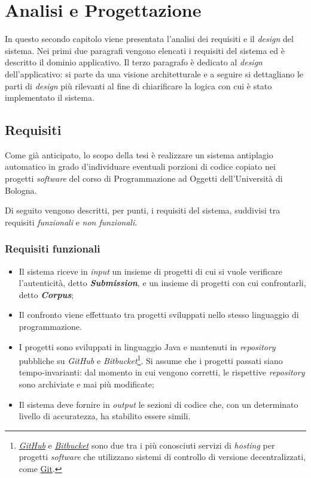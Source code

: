 \chapter{Analisi e Progettazione}
\label{chapter:analysis}
In questo secondo capitolo viene presentata l'analisi dei requisiti e il \textit{design} del sistema.
%
Nei primi due paragrafi vengono elencati i requisiti del sistema ed è descritto il dominio applicativo.
%
Il terzo paragrafo è dedicato al \textit{design} dell'applicativo: si parte da una visione architetturale e a seguire si dettagliano le parti di \textit{design} più rilevanti al fine di chiarificare la logica con cui è stato implementato il sistema.

\section{Requisiti}
Come già anticipato, lo scopo della tesi è realizzare un sistema antiplagio automatico in grado d'individuare eventuali porzioni di codice copiato nei progetti \textit{software} del corso di Programmazione ad Oggetti dell'Università di Bologna.

Di seguito vengono descritti, per punti, i requisiti del sistema, suddivisi tra requisiti \textit{funzionali} e \textit{non funzionali}.

\subsection*{Requisiti funzionali}
\begin{itemize}
    \item Il sistema riceve in \textit{input} un insieme di progetti di cui si vuole verificare l'autenticità, detto \textbf{\textit{Submission}}, e un insieme di progetti con cui confrontarli, detto \textbf{\textit{Corpus}};
    
    \item Il confronto viene effettuato tra progetti sviluppati nello stesso linguaggio di programmazione.
    
    \item I progetti sono sviluppati in linguaggio Java e mantenuti in \textit{repository} pubbliche su \textit{GitHub} e \textit{Bitbucket}\footnote{
        \href{https://github.com}{\textit{GitHub}} e \href{https://bitbucket.org}{\textit{Bitbucket}} sono due tra i più conosciuti servizi di \textit{hosting} per progetti \textit{software} che utilizzano sistemi di controllo di versione decentralizzati, come \href{https://git-scm.com}{Git}.
    }. Si assume che i progetti passati siano tempo-invarianti: dal momento in cui vengono corretti, le rispettive \textit{repository} sono archiviate e mai più modificate;

    \item Il sistema deve fornire in \textit{output} le sezioni di codice che, con un determinato livello di accuratezza, ha stabilito essere simili.
\end{itemize}

